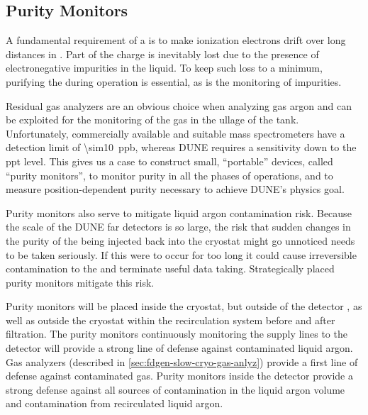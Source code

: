 \subsection{Purity Monitors} 
\label{sec:fdgen-slow-cryo-purity-mon}
\label{sec:fdsp-slow-cryo-purity-mon} %
\label{sec:fddp-slow-cryo-purity-mon} %
A fundamental requirement of a   is to make ionization electrons drift over long distances in . Part of the charge is inevitably lost due to the presence of electronegative impurities in the liquid. To keep such loss to a minimum, purifying the  during operation is essential, as is the monitoring of impurities.

Residual gas analyzers are an obvious choice when analyzing gas argon and can be exploited for the monitoring of the gas in the ullage of the tank. Unfortunately, commercially available and suitable mass spectrometers have a detection limit of \SI{\sim10}{ppb}, whereas DUNE requires a sensitivity down to the \si{ppt} level. This gives us a case to construct small, ``portable'' devices, called ``purity monitors'', to monitor purity in all the phases of operations, and to measure position-dependent purity necessary to achieve DUNE's physics goal. 

Purity monitors also serve to mitigate liquid argon contamination risk.  Because the scale of the DUNE far detectors is so large, the risk that sudden changes in the purity of the  being injected back into the cryostat might go unnoticed needs to be taken seriously.  If this were to occur for too long it could cause irreversible contamination to the  and terminate useful data taking.  Strategically placed purity monitors mitigate this risk. 

Purity monitors will be placed inside the cryostat, but outside of the detector , as well as outside the cryostat within the recirculation system before and after filtration. The purity monitors continuously monitoring the  supply lines to the detector will provide a strong line of defense against contaminated liquid argon. Gas analyzers (described in \ref{sec:fdgen-slow-cryo-gas-anlyz}) provide a first line of defense against contaminated gas.  Purity monitors inside the detector provide a strong defense against all sources of contamination in the liquid argon volume and contamination from recirculated liquid argon.

